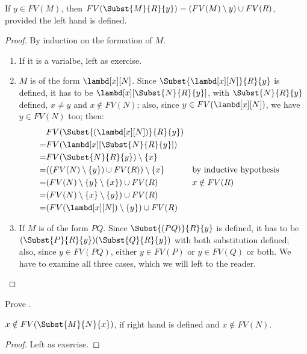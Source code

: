 \documentclass[../../../include/open-logic-section]{subfiles}
\begin{document}
\begin{thm} 
  If $y \in FV(M)$, then $FV(\Subst{M}{R}{y}) = (FV(M) \setminus
  {y}) \cup FV(R)$, provided the left hand is defined.
\end{thm}
\begin{proof}
  By induction on the formation of $M$.
  \begin{enumerate}
  \item If it is a varialbe, left as exercise. 
  \item $M$ is of the form $\lambd[x][N]$. Since
    $\Subst{\lambd[x][N]}{R}{y}$ is defined, it has to be
    $\lambd[x][\Subst{N}{R}{y}]$, with $\Subst{N}{R}{y}$
    defined, $x \neq y$ and $x \notin FV(N)$; also, since $y \in
    FV(\lambd[x][N])$, we have $y \in FV(N)$ too; then:
    \begin{align*}
      &FV(\Subst{(\lambd[x][N])}{R}{y}) \\
      =&FV(\lambd[x][\Subst{N}{R}{y}]) \\
      =&FV(\Subst{N}{R}{y}) \setminus \{x\} \\
      =&((FV(N) \setminus \{y\}) \cup FV(R)) \setminus \{x\}
       && \text{by inductive hypothesis} \\
      =&(FV(N) \setminus \{y\} \setminus \{x\}) \cup FV(R)
       && x \notin FV(R) \\
      =&(FV(N) \setminus \{x\} \setminus \{y\}) \cup FV(R) \\
      =& (FV(\lambd[x][N]) \setminus \{y\}) \cup FV(R)
    \end{align*}
  \item If $M$ is of the form $PQ$. Since
    $\Subst{(PQ)}{R}{y}$ is defined, it has to be
    $(\Subst{P}{R}{y})(\Subst{Q}{R}{y})$ with both substitution
    defined; also, since $y \in FV(PQ)$, either $y \in FV(P)$ or
    $y \in FV(Q)$ or both. We have to examine all three cases, which
    we will left to the reader.
  \end{enumerate}
\end{proof}

\begin{prob}
  Prove .
\end{prob}

\begin{thm}
  $x \notin FV(\Subst{M}{N}{x})$, if right hand is
  defined and $x \notin FV(N)$.
\end{thm}
\begin{proof}
  Left as exercise.
\end{proof}
\end{document}
